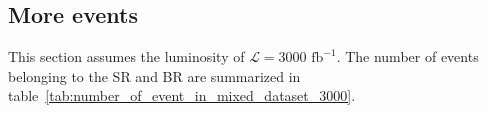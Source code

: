 \documentclass[12pt]{article}
\begin{document}
    \subsection{More events}%
    \label{sub:more_events}
        This section assumes the luminosity of $\mathcal{L} = \text{3000 fb}^{-1}$. The number of events belonging to the SR and BR are summarized in table~\ref{tab:number_of_event_in_mixed_dataset_3000}.
        \begin{table}[htpb]
            \centering
            \caption{The number of events of mixed datasets under different selection cuts.}
            \label{tab:number_of_event_in_mixed_dataset_3000}
             \\
        \end{table}
\end{document}
